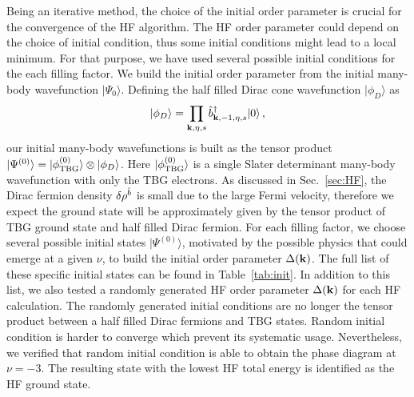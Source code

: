 \documentclass[prb,aps,nofootinbib,amssymb,twocolumn,superscriptaddress,10pt]{revtex4-2}
\begin{document}
\begin{widetext}
Being an iterative method, the choice of the initial order parameter is crucial for the convergence of the HF algorithm. The HF order parameter could depend on the choice of initial condition, thus some initial conditions might lead to a local minimum. For that purpose, we have used several possible initial conditions for the each filling factor. We build the initial order parameter from the initial many-body wavefunction $|\Psi_0\rangle$. Defining the half filled Dirac cone wavefunction $|\phi_D\rangle$ as
\begin{equation}
	|\phi_D\rangle = \prod_{\mathbf{k},\eta,s}\hat{b}^\dagger_{\mathbf{k},-1, \eta, s}|0\rangle\,,\label{app:eq:halffilleddirac}
\end{equation}
our initial many-body wavefunctions is built as the tensor product $|\Psi^{(0)}\rangle= |\phi^{(0)}_{\rm{TBG}}\rangle \otimes |\phi_D\rangle$. Here $|\phi^{(0)}_{\rm{TBG}}\rangle$ is a single Slater determinant many-body wavefunction with only the TBG electrons. As discussed in Sec.~\ref{sec:HF}, the Dirac fermion density $\delta \rho^{\hat{b}}$ is small due to the large Fermi velocity, therefore we expect the ground state will be approximately given by the tensor product of TBG ground state and half filled Dirac fermion. For each filling factor, we choose several possible initial states $|\Psi^{(0)}\rangle$, motivated by the possible physics that could emerge at a given $\nu$, to build the initial order parameter $\Delta(\mathbf{k})$. The full list of these specific initial states can be found in Table~\ref{tab:init}. In addition to this list, we also tested a randomly generated HF order parameter $\Delta(\mathbf{k})$ for each HF calculation. The randomly generated initial conditions are no longer the tensor product between a half filled Dirac fermions and TBG states. Random initial condition is harder to converge which prevent its systematic usage. Nevertheless, we verified that random initial condition is able to obtain the phase diagram at $\nu=-3$. The resulting state with the lowest HF total energy is identified as the HF ground state.


\end{widetext}
\end{document}

